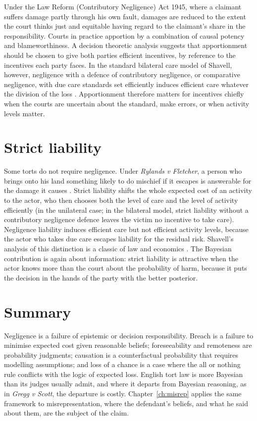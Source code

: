 Under the Law Reform (Contributory Negligence) Act 1945, where a claimant suffers damage partly through his own fault, damages are reduced to the extent the court thinks just and equitable having regard to the claimant's share in the responsibility. Courts in practice apportion by a combination of causal potency and blameworthiness. A decision theoretic analysis suggests that apportionment should be chosen to give both parties efficient incentives, by reference to the incentives each party faces. In the standard bilateral care model of Shavell, however, negligence with a defence of contributory negligence, or comparative negligence, with due care standards set efficiently induces efficient care whatever the division of the loss \citep{shavell1987}. Apportionment therefore matters for incentives chiefly when the courts are uncertain about the standard, make errors, or when activity levels matter.

\section{Strict liability}

Some torts do not require negligence. Under \emph{Rylands v Fletcher}, a person who brings onto his land something likely to do mischief if it escapes is answerable for the damage it causes \citep{rylands1868}. Strict liability shifts the whole expected cost of an activity to the actor, who then chooses both the level of care and the level of activity efficiently (in the unilateral case; in the bilateral model, strict liability without a contributory negligence defence leaves the victim no incentive to take care). Negligence liability induces efficient care but not efficient activity levels, because the actor who takes due care escapes liability for the residual risk. Shavell's analysis of this distinction is a classic of law and economics \citep{shavell1987}. The Bayesian contribution is again about information: strict liability is attractive when the actor knows more than the court about the probability of harm, because it puts the decision in the hands of the party with the better posterior.

\section{Summary}

Negligence is a failure of epistemic or decision responsibility. Breach is a failure to minimise expected cost given reasonable beliefs; foreseeability and remoteness are probability judgments; causation is a counterfactual probability that requires modelling assumptions; and loss of a chance is a case where the all or nothing rule conflicts with the logic of expected loss. English tort law is more Bayesian than its judges usually admit, and where it departs from Bayesian reasoning, as in \emph{Gregg v Scott}, the departure is costly. Chapter~\ref{ch:misrep} applies the same framework to misrepresentation, where the defendant's beliefs, and what he said about them, are the subject of the claim.

